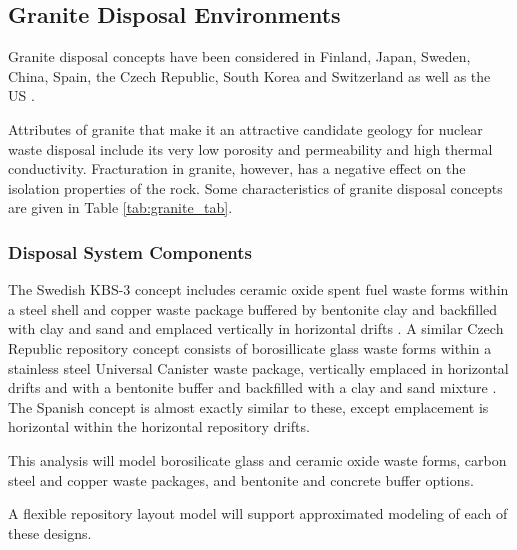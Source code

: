 
\subsection{Granite Disposal Environments}

Granite disposal concepts have been considered in Finland, Japan, Sweden, China,  
Spain, the Czech Republic, South Korea and Switzerland as well as the \gls{US} 
\cite{hardin_generic_2011, andra_granite:_2005, von_lensa_red-impact_2008}. 

Attributes of granite that make it an attractive candidate geology for nuclear 
waste disposal include its very low porosity and permeability and high thermal 
conductivity. Fracturation in granite, however, has a negative effect on the 
isolation properties of the rock.
Some characteristics of granite disposal 
concepts are given in Table \ref{tab:granite_tab}.   



\subsubsection{Disposal System Components}

The Swedish KBS-3 concept includes ceramic oxide spent fuel waste forms within a 
steel shell and copper waste package buffered by bentonite clay and backfilled 
with clay and sand and emplaced vertically in horizontal drifts 
\cite{ab_long-term_2006}.
A similar Czech Republic repository concept consists of 
borosillicate glass waste forms within a stainless steel Universal Canister waste 
package, vertically emplaced in horizontal drifts and with a bentonite buffer  
and backfilled with a clay and sand mixture \cite{ von_lensa_red-impact_2008}.
The Spanish concept is almost exactly similar to 
these, except emplacement is horizontal within the horizontal repository drifts.



This analysis will model borosilicate glass and ceramic oxide waste forms, 
carbon steel and copper waste packages, and bentonite and concrete buffer 
options.  

A flexible repository layout model will support approximated modeling of
each of these designs.


